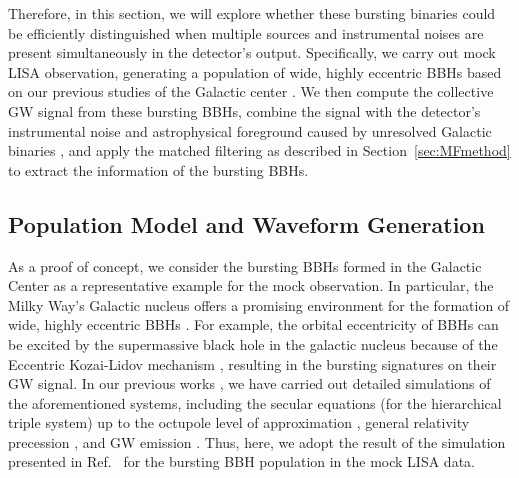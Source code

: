 \documentclass[%
 reprint,
 amsmath,amssymb,
 aps,
]{revtex4-2}
\begin{document}
Therefore, in this section, we will explore whether these bursting binaries could be efficiently distinguished when multiple sources and instrumental noises are present simultaneously in the detector's output. Specifically, we carry out mock LISA observation, generating a population of wide, highly eccentric BBHs based on our previous studies of the Galactic center \citep{Xuan+23b}. We then compute the collective GW signal from these bursting BBHs, combine the signal with the detector's instrumental noise and astrophysical foreground caused by unresolved Galactic binaries \citep{Cornish2017galacticforeground,Robson+19LISAnoise}, and apply the matched filtering as described in Section~\ref{sec:MFmethod} to extract the information of the bursting BBHs. 

\subsection{Population Model and Waveform Generation}\label{subsec: population}

As a proof of concept, we consider the bursting BBHs formed in the Galactic Center as a representative example for the mock observation. In particular, the Milky Way's Galactic nucleus offers a promising environment for the formation of wide, highly eccentric BBHs \citep[see, e.g.,][]{Kocsis_2012,Hoang+18,Hoang+19,Stephan+19,Wang+21,Rose+23collisiongc,Arca+23,Zhang24}. For example, the orbital eccentricity of BBHs can be excited by the supermassive black hole in the galactic nucleus because of the Eccentric Kozai-Lidov mechanism \citep{Kozai1962,Lidov1962,Naoz16}, resulting in the bursting signatures on their GW signal. In our previous works \citep{Hoang+18,Xuan+23b,Xuan24bkg}, we have carried out detailed simulations of the aforementioned systems, including the secular equations (for the hierarchical triple system) up to the octupole level of approximation \citep{Naoz+13}, general relativity precession \citep[e.g.,][]{naoz13}, and GW
emission \citep{Peters64,Zwick+20}. Thus, here, we adopt the result of the simulation presented in Ref.~\citep{Xuan+23b} for the bursting BBH population in the mock LISA data.
\end{document}
